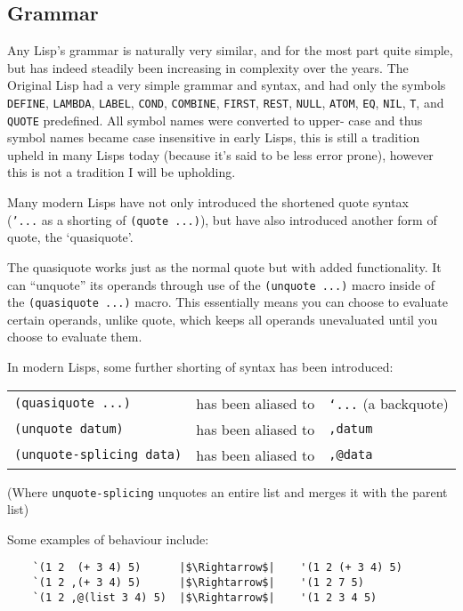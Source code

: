 \documentclass{article}
\newcommand{\code}[1]{\texttt{#1}}
\begin{document}
  \subsection{Grammar}
    Any Lisp's grammar is naturally very similar, and for the most part quite
    simple, but has indeed steadily been increasing in complexity over the years.
    The Original Lisp had a very simple grammar and syntax, and had only the
    symbols \code{DEFINE}, \code{LAMBDA}, \code{LABEL}, \code{COND},
    \code{COMBINE}, \code{FIRST}, \code{REST}, \code{NULL}, \code{ATOM},
    \code{EQ}, \code{NIL}, \code{T}, and \code{QUOTE} predefined\autocite{sexp}.
    All symbol names were converted to upper- case and thus
    symbol names became case insensitive in early Lisps, this is
    still a tradition upheld in many Lisps today (because it's said to be less
    error prone), however this is not a tradition I will be upholding.

    Many modern Lisps have not only introduced the shortened quote syntax\\
    (\code{'...} as a shorting of \code{(quote ...)}), but have also introduced
    another form of quote, the `quasiquote'.

    The quasiquote works just as the normal quote but with added functionality.
    It can ``unquote'' its operands through use of the \code{(unquote ...)}
    macro inside of the \code{(quasiquote ...)} macro. This essentially means
    you can choose to evaluate certain operands, unlike quote, which keeps all
    operands unevaluated until you choose to evaluate them.

    In modern Lisps, some further shorting of syntax has been introduced:\\

    \begin{tabular}{lll}
        \code{(quasiquote ...)}       & has been aliased to& \code{`...} (a backquote)\\
        \code{(unquote datum)}        & has been aliased to& \code{,datum}\\
        \code{(unquote-splicing data)}& has been aliased to& \code{,@data}
    \end{tabular}

    {\small(Where \code{unquote-splicing} unquotes an entire list and merges it with
    the parent list)}

    Some examples of behaviour include:
    \begin{verbatim}
    `(1 2  (+ 3 4) 5)      |$\Rightarrow$|    '(1 2 (+ 3 4) 5)
    `(1 2 ,(+ 3 4) 5)      |$\Rightarrow$|    '(1 2 7 5)
    `(1 2 ,@(list 3 4) 5)  |$\Rightarrow$|    '(1 2 3 4 5)
    \end{verbatim}
\end{document}
